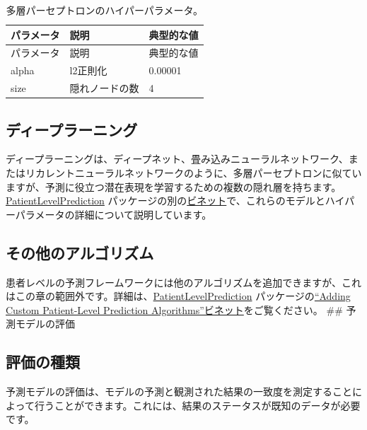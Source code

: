 \documentclass[
  11pt]{book}
\theoremstyle{definition}
\theoremstyle{definition}
\theoremstyle{definition}
\theoremstyle{definition}
\theoremstyle{remark}
\begin{document}
\begin{longtable}[]{@{}lll@{}}
\caption{\label{tab:mpParameters} 多層パーセプトロンのハイパーパラメータ。}\tabularnewline
\toprule\noalign{}
パラメータ & 説明 & 典型的な値 \\
\midrule\noalign{}
\endfirsthead
\toprule\noalign{}
パラメータ & 説明 & 典型的な値 \\
\midrule\noalign{}
\endhead
\bottomrule\noalign{}
\endlastfoot
alpha & l2正則化 & 0.00001 \\
size & 隠れノードの数 & 4 \\
\end{longtable}

\subsection{ディープラーニング}\label{ux30c7ux30a3ux30fcux30d7ux30e9ux30fcux30cbux30f3ux30b0}

ディープラーニングは、ディープネット、畳み込みニューラルネットワーク、またはリカレントニューラルネットワークのように、多層パーセプトロンに似ていますが、予測に役立つ潜在表現を学習するための複数の隠れ層を持ちます。\href{https://ohdsi.github.io/PatientLevelPrediction/}{PatientLevelPrediction} パッケージの別の\href{https://ohdsi.github.io/PatientLevelPrediction/articles/BuildingDeepLearningModels.html}{ビネット}で、これらのモデルとハイパーパラメータの詳細について説明しています。   

\subsection{その他のアルゴリズム}\label{ux305dux306eux4ed6ux306eux30a2ux30ebux30b4ux30eaux30baux30e0}

患者レベルの予測フレームワークには他のアルゴリズムを追加できますが、これはこの章の範囲外です。詳細は、\href{https://ohdsi.github.io/PatientLevelPrediction/}{PatientLevelPrediction} パッケージの\href{https://ohdsi.github.io/PatientLevelPrediction/articles/AddingCustomAlgorithms.html}{``Adding Custom Patient-Level Prediction Algorithms''ビネット}をご覧ください。
\#\# 予測モデルの評価

\subsection{評価の種類}\label{ux8a55ux4fa1ux306eux7a2eux985e}

予測モデルの評価は、モデルの予測と観測された結果の一致度を測定することによって行うことができます。これには、結果のステータスが既知のデータが必要です。 
\end{document}
